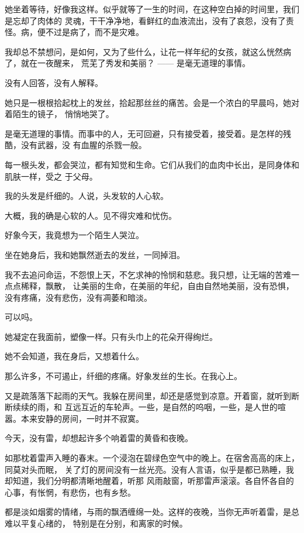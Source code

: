 		她坐着等待，好像我这样。似乎就等了一生的时间，在这种空白掉的时间里，我们是忘却了肉体的
	灵魂，干干净净地，看鲜红的血液流出，没有了哀怨，没有了责怪。病，便不过是病了，而不是灾难。

		我却总不禁想问，是如何，又为了些什么，让花一样年纪的女孩，就这么恍然病了，就在一夜醒来，
	荒芜了秀发和美丽？ —— 是毫无道理的事情。

		没有人回答，没有人解释。

		她只是一根根拾起枕上的发丝，拾起那丝丝的痛苦。会是一个浓白的早晨吗，她对着陌生的镜子，
	悄悄地哭了。

		是毫无道理的事情。而事中的人，无可回避，只有接受着，接受着。是怎样的残酷，没有武器，没
	有血腥的杀戮一般。

		每一根头发，都会哭泣，都有知觉和生命。它们从我们的血肉中长出，是同身体和肌肤一样，受之
	于父母。

		我的头发是纤细的。人说，头发软的人心软。

		大概，我的确是心软的人。见不得灾难和忧伤。


		好象今天，我竟想为一个陌生人哭泣。

		坐在她身后，我和她飘然逝去的发丝，一同掉泪。

		我不去追问命运，不怨恨上天，不乞求神的怜悯和慈悲。我只想，让无端的苦难一点点稀释，飘散，
	让美丽的生命，在美丽的年纪，自由自然地美丽，没有恐惧，没有疼痛，没有悲伤，没有凋萎和暗淡。

		可以吗。

		她凝定在我面前，塑像一样。只有头巾上的花朵开得绚烂。

		她不会知道，我在身后，又想着什么。

		那么许多，不可遏止，纤细的疼痛。好象发丝的生长。在我心上。

	\endwriting



		又是疏落落下起雨的天气。我躲在房间里，却还是感觉到凉意。开着窗，就听到断断续续的雨，和
	互远互近的车轮声。一些，是自然的呜咽，一些，是人世的喧嚣。本来安静的房间，一时并不寂寞。

		今天，没有雷，却想起许多个响着雷的黄昏和夜晚。

		如那枕着雷声入睡的春末。一个浸泡在碧绿色空气中的晚上。在宿舍高高的床上，同莫对头而眠，
	关了灯的房间没有一丝光亮。没有人言语，似乎是都已熟睡，我却知道，我们分明都清晰地醒着，听那
	风雨敲窗，听那雷声滚滚。各自怀各自的心事，有怅惘，有悲伤，也有乡愁。

		都是淡如烟雾的情绪，与雨的飘洒缠绵一处。这样的夜晚，当你无声听着雷，是总难以平复心绪的，
	特别是在分别，和离家的时候。

